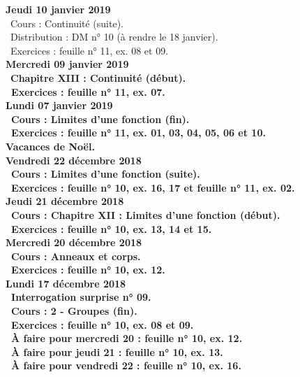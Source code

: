 \documentclass[12pt,a4paper]{article}
\begin{document}
\noindent\textbf{Jeudi 10 janvier 2019}\\
\bu\ Cours : Continuité (suite).\\
\bu\ Distribution : DM n° 10 (à rendre le 18 janvier).\\
\bu\ Exercices : feuille n° 11, ex. 08 et 09.\vspace{.4cm}\\
 
\noindent\textbf{Mercredi 09 janvier 2019} \\
\bu\ \bf Chapitre XIII \rm : Continuité (début).\\
\bu\ Exercices : feuille n° 11, ex. 07.\vspace{.4cm}\\
 
\noindent\textbf{Lundi 07 janvier 2019} \\
\bu\ Cours : Limites d'une fonction (fin).\\
\bu\ Exercices : feuille n° 11, ex. 01, 03, 04, 05, 06 et 10.\vspace{.4cm}\\

\noindent\textbf{\bf Vacances de Noël}.\vspace{.4cm}\\

\noindent\textbf{Vendredi 22 décembre 2018}\\ 
\bu\ Cours : Limites d'une fonction (suite).\\
\bu\ Exercices : feuille n° 10, ex. 16, 17 et feuille n° 11, ex. 02.\vspace{.4cm}\\
 
\noindent\textbf{Jeudi 21 décembre 2018}\\
\bu\ Cours : \bf Chapitre XII \rm : Limites d'une fonction (début).\\
\bu\ Exercices : feuille n° 10, ex. 13, 14 et 15.\vspace{.4cm}\\
 
\noindent\textbf{\bf Mercredi 20 décembre 2018}\\
\bu\ Cours : Anneaux et corps.\\ 
\bu\ Exercices : feuille n° 10, ex. 12.\vspace{.4cm}\\
 
\noindent\textbf{Lundi 17 décembre 2018}\\
\bu\ Interrogation surprise n° 09.\\
\bu\ Cours : 2 - Groupes (fin).\\ 
\bu\ Exercices : feuille n° 10, ex. 08 et 09.\\
\bu\ À faire pour mercredi 20 : feuille n° 10, ex. 12.\\
\bu\ À faire pour jeudi 21 : feuille n° 10, ex. 13.\\
\bu\ À faire pour vendredi 22 : feuille n° 10, ex. 16.\vspace{.4cm}\\ 
\end{document}
